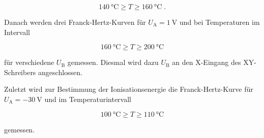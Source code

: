 \begin{equation*}
    \SI{140}{\celsius} \geq T \geq \SI{160}{\celsius} \; .
\end{equation*}

Danach werden drei Franck-Hertz-Kurven für $U_\text{A} =\SI{1}{\volt}$ und bei Temperaturen im Intervall

\begin{equation*}
    \SI{160}{\celsius} \geq T \geq \SI{200}{\celsius}
\end{equation*}

für verschiedene $U_\text{B}$ gemessen.
Diesmal wird dazu $U_\text{B}$ an den X-Eingang des XY-Schreibers angeschlossen.

Zuletzt wird zur Bestimmung der Ionisationsenergie die Franck-Hertz-Kurve für $U_\text{A} = \SI{-30}{\volt}$
und im Temperaturintervall 

\begin{equation*}
    \SI{100}{\celsius} \geq T \geq \SI{110}{\celsius}
\end{equation*}

gemessen.
